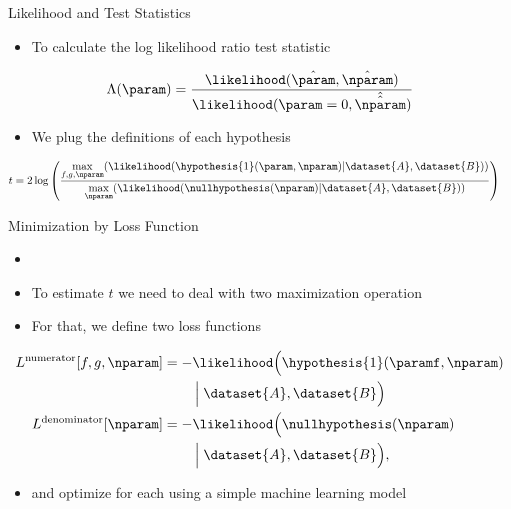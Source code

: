 \documentclass[notheorems]{beamer}
\begin{document}
\begin{frame}{Likelihood and Test Statistics}
    \begin{itemize}
        \item To calculate the log likelihood ratio test statistic
    \end{itemize}
    \begin{equation}
        \Lambda(\param) = \dfrac{
            \likelihood(\hat{\param},\hat{\nparam})
        }{
            \likelihood(\param = 0, \hat{\hat{\nparam}})
        }
    \end{equation}
    \begin{itemize}
        \item We plug the definitions of each hypothesis
    \end{itemize}
    \begin{equation}
    \begin{aligned}
        t &= 2 \log \left(
            \frac{
                \max\limits_{f, g, \nparam} (\likelihood(\hypothesis{1}(\param, \nparam)|\dataset{A}, \dataset{B}))
            }{
                \max\limits_{\nparam} (\likelihood(\nullhypothesis(\nparam)|\dataset{A}, \dataset{B}))
        }\right)
    \end{aligned}
    \end{equation}
\end{frame}

\begin{frame}{Minimization by Loss Function}
    \begin{itemize}
        \item {}
        \item To estimate $t$ we need to deal with two maximization operation
        \item For that, we define two loss functions
    \end{itemize}
    {\scriptsize
    \begin{equation}
    \begin{aligned}
        L^\text{numerator}[f, g, \nparam]
            &= -\likelihood\Bigl(\hypothesis{1}(\paramf, \nparam) \\
            &\qquad\Bigm| \dataset{A}, \dataset{B}\Bigr) \\
        L^\text{denominator}[\nparam]
            &= -\likelihood\Bigl(\nullhypothesis(\nparam) \\
            &\qquad\Bigm| \dataset{A}, \dataset{B}\Bigr),
    \end{aligned}
    \end{equation}
    }
    \begin{itemize}
        \item and optimize for each using a simple machine learning model
    \end{itemize}
\end{frame}
\end{document}

